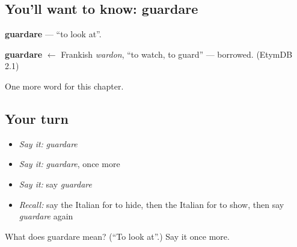 \subsection*{You'll want to know: guardare}
\textbf{guardare} — \textquotedblleft{}to look at\textquotedblright{}.

\begin{cousinweb}
\textbf{guardare} $\leftarrow$ Frankish \emph{wardon}, \textquotedblleft{}to watch, to guard\textquotedblright{} — borrowed. (EtymDB 2.1)
\end{cousinweb}

\begin{grammarlens}[title={What you've built}]
One more word for this chapter.
\end{grammarlens}

\subsection*{Your turn}
\begin{itemize}
\raggedright
  \item \emph{Say it:} \emph{guardare}
  \item \emph{Say it:} \emph{guardare}, once more
  \item \emph{Say it:} say \emph{guardare}
  \item \emph{Recall:} say the Italian for to hide, then the Italian for to show, then say \emph{guardare} again
\end{itemize}

\begin{tcolorbox}[breakable,colback=teal!4,colframe=teal!35!black,title={Before you move on}]
What does guardare mean? (\textquotedblleft{}To look at\textquotedblright{}.) Say it once more.
\end{tcolorbox}
